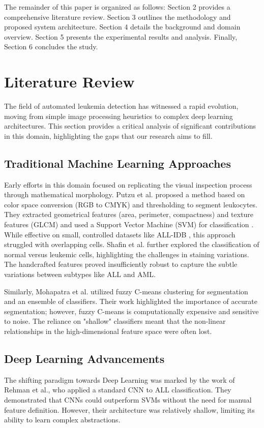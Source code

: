 \documentclass[12pt, a4paper]{article}
\begin{document}
The remainder of this paper is organized as follows: Section 2 provides a comprehensive literature review. Section 3 outlines the methodology and proposed system architecture. Section 4 details the background and domain overview. Section 5 presents the experimental results and analysis. Finally, Section 6 concludes the study.

\section{Literature Review}

The field of automated leukemia detection has witnessed a rapid evolution, moving from simple image processing heuristics to complex deep learning architectures. This section provides a critical analysis of significant contributions in this domain, highlighting the gaps that our research aims to fill.

\subsection{Traditional Machine Learning Approaches}
Early efforts in this domain focused on replicating the visual inspection process through mathematical morphology. Putzu et al. proposed a method based on color space conversion (RGB to CMYK) and thresholding to segment leukocytes. They extracted geometrical features (area, perimeter, compactness) and texture features (GLCM) and used a Support Vector Machine (SVM) for classification \cite{r7}. While effective on small, controlled datasets like ALL-IDB \cite{r7}, this approach struggled with overlapping cells. Shafin et al. \cite{r8} further explored the classification of normal versus leukemic cells, highlighting the challenges in staining variations. The handcrafted features proved insufficiently robust to capture the subtle variations between subtypes like ALL and AML.

Similarly, Mohapatra et al. utilized fuzzy C-means clustering for segmentation and an ensemble of classifiers. Their work highlighted the importance of accurate segmentation; however, fuzzy C-means is computationally expensive and sensitive to noise. The reliance on "shallow" classifiers meant that the non-linear relationships in the high-dimensional feature space were often lost.

\subsection{Deep Learning Advancements}
The shifting paradigm towards Deep Learning was marked by the work of Rehman et al., who applied a standard CNN to ALL classification. They demonstrated that CNNs could outperform SVMs without the need for manual feature definition. However, their architecture was relatively shallow, limiting its ability to learn complex abstractions.
\end{document}
